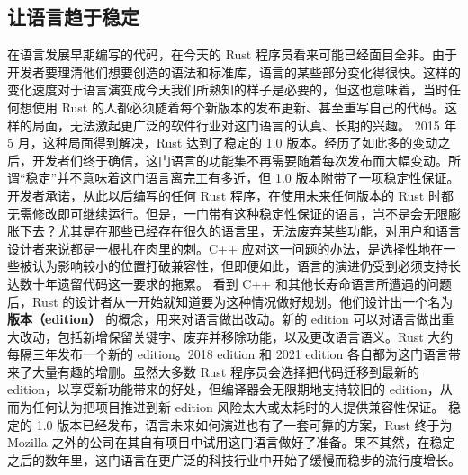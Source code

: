 \subsection{让语言趋于稳定}
\label{idx:idx_a0d14c34}
在语言发展早期编写的代码，在今天的 Rust 程序员看来可能已经面目全非。由于开发者要理清他们想要创造的语法和标准库，语言的某些部分变化得很快。这样的变化速度对于语言演变成今天我们所熟知的样子是必要的，但这也意味着，当时任何想使用 Rust 的人都必须随着每个新版本的发布更新、甚至重写自己的代码。这样的局面，无法激起更广泛的软件行业对这门语言的认真、长期的兴趣。
2015 年 5 月，这种局面得到解决，Rust 达到了稳定的 1.\allowbreak{}0 版本。经历了如此多的变动之后，开发者们终于确信，这门语言的功能集不再需要随着每次发布而大幅变动。所谓“稳定”并不意味着这门语言离完工有多近，但 1.\allowbreak{}0 版本附带了一项稳定性保证。开发者承诺，从此以后编写的任何 Rust 程序，在使用未来任何版本的 Rust 时都无需修改即可继续运行。但是，一门带有这种稳定性保证的语言，岂不是会无限膨胀下去？尤其是在那些已经存在很久的语言里，无法废弃某些功能，对用户和语言设计者来说都是一根扎在肉里的刺。C++ 应对这一问题的办法，是选择性地在一些被认为影响较小的位置打破兼容性，但即便如此，语言的演进仍受到必须支持长达数十年遗留代码这一要求的拖累。
\label{idx:idx_7d1e474a}
\label{idx:idx_5fdaed9b}
看到 C++ 和其他长寿命语言所遭遇的问题后，Rust 的设计者从一开始就知道要为这种情况做好规划。他们设计出一个名为 \textbf{版本（edition）} 的概念，用来对语言做出改动。新的 edition 可以对语言做出重大改动，包括新增保留关键字、废弃并移除功能，以及更改语言语义。Rust 大约每隔三年发布一个新的 edition。2018 edition 和 2021 edition 各自都为这门语言带来了大量有趣的增删。虽然大多数 Rust 程序员会选择把代码迁移到最新的 edition，以享受新功能带来的好处，但编译器会无限期地支持较旧的 edition，从而为任何认为把项目推进到新 edition 风险太大或太耗时的人提供兼容性保证。
稳定的 1.\allowbreak{}0 版本已经发布，语言未来如何演进也有了一套可靠的方案，Rust 终于为 Mozilla 之外的公司在其自有项目中试用这门语言做好了准备。果不其然，在稳定之后的数年里，这门语言在更广泛的科技行业中开始了缓慢而稳步的流行度增长。
